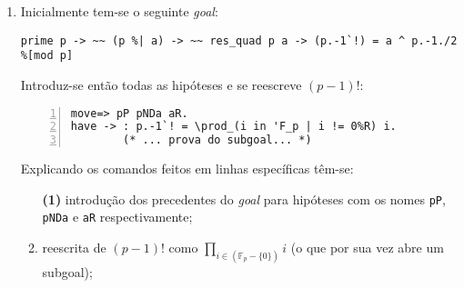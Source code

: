 \begin{enumerate}[label=\textbf{\roman*.}]


        \item Inicialmente tem-se o seguinte \textit{goal}:
        \begin{lstlisting}[language=coq,frame=single,tabsize=1]
prime p -> ~~ (p %| a) -> ~~ res_quad p a -> (p.-1`!) = a ^ p.-1./2 %[mod p]
        \end{lstlisting}
        Introduz-se então todas as hipóteses e se reescreve $(p-1)!$:
        \begin{lstlisting}[language=coq,frame=single, numbers=left,stepnumber=1,tabsize=1]
move=> pP pNDa aR.
have -> : p.-1`! = \prod_(i in 'F_p | i != 0%R) i.
        (* ... prova do subgoal... *)
        \end{lstlisting}
        Explicando os comandos feitos em linhas específicas têm-se:
        \begin{enumerate}
                \item[\textbf{(1)}] introdução dos precedentes do \textit{goal} para hipóteses com os nomes \lstinline[language=coq]|pP|, \lstinline[language=coq]|pNDa| e \lstinline[language=coq]|aR| respectivamente;
                
                \item[\textbf{(2)}] reescrita de $(p-1)!$ como $\prod_{i \in (\mathbb{F}_p - \{0\})} i$ (o que por sua vez abre um subgoal);
                
        \end{enumerate}



\end{enumerate}
